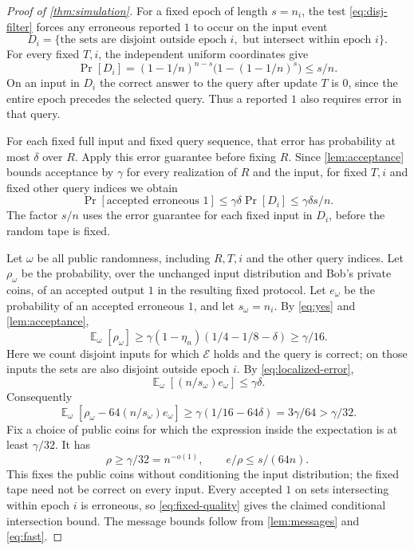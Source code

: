 \documentclass[11pt]{article}
\theoremstyle{plain}
\newcommand{\E}{\mathop{\mathbb{E}}}
\newcommand{\cE}{\mathcal{E}}
\begin{document}
\begin{proof}[Proof of \cref{thm:simulation}]
For a fixed epoch of length $s=n_i$, the test \eqref{eq:disj-filter}
forces any erroneous reported $1$ to occur on the input event
\[
 D_i=\{\text{the sets are disjoint outside epoch }i,
       \text{ but intersect within epoch }i\}.
\]
For every fixed $T,i$, the independent uniform coordinates give
\begin{equation}\label{eq:rare}
 \Pr[D_i]=(1-1/n)^{n-s}\big(1-(1-1/n)^s\big)\le s/n.
\end{equation}
On an input in $D_i$ the correct answer to the query after update $T$ is $0$, since
the entire epoch precedes the selected query. Thus a reported $1$
also requires error in that query.

For each fixed full input and fixed query sequence, that error has
probability at most $\delta$ over $R$. Apply this error guarantee
before fixing $R$. Since \cref{lem:acceptance} bounds acceptance by
$\gamma$ for every realization of $R$ and the input, for fixed $T,i$
and fixed other query indices we obtain
\begin{equation}\label{eq:localized-error}
 \Pr[\text{accepted erroneous }1]\le\gamma\delta\Pr[D_i]
 \le\gamma\delta s/n.
\end{equation}
The factor $s/n$ uses the error guarantee for each fixed input in $D_i$,
before the random tape is fixed.

Let $\omega$ be all public randomness, including $R,T,i$ and the
other query indices. Let $\rho_\omega$ be the probability, over the
unchanged input distribution and Bob's private coins, of an accepted
output $1$ in the resulting fixed protocol. Let $e_\omega$ be the
probability of an accepted erroneous $1$, and let $s_\omega=n_i$.
By \eqref{eq:yes} and \cref{lem:acceptance},
\begin{equation}\label{eq:rho-average}
 \E_\omega[\rho_\omega]
 \ge\gamma(1-\eta_n)(1/4-1/8-\delta)\ge\gamma/16.
\end{equation}
Here we count disjoint inputs for which $\cE$ holds and the query is
correct; on those inputs the sets are also disjoint outside epoch $i$.
By \eqref{eq:localized-error},
\[
 \E_\omega[(n/s_\omega)e_\omega]\le\gamma\delta.
\]
Consequently
\[
 \E_\omega[\rho_\omega-64(n/s_\omega)e_\omega]
 \ge\gamma(1/16-64\delta)=3\gamma/64>\gamma/32.
\]
Fix a choice of public coins for which the expression inside the expectation is at least $\gamma/32$.
It has
\begin{equation}\label{eq:fixed-quality}
 \rho\ge\gamma/32=n^{-o(1)},\qquad e/\rho\le s/(64n).
\end{equation}
This fixes the public coins without conditioning the input distribution;
the fixed tape need not be correct on every input.
Every accepted $1$ on sets intersecting within epoch $i$ is erroneous, so
\eqref{eq:fixed-quality} gives the claimed conditional intersection bound.
The message bounds follow from \cref{lem:messages} and \eqref{eq:fast}.
\end{proof}
\end{document}

